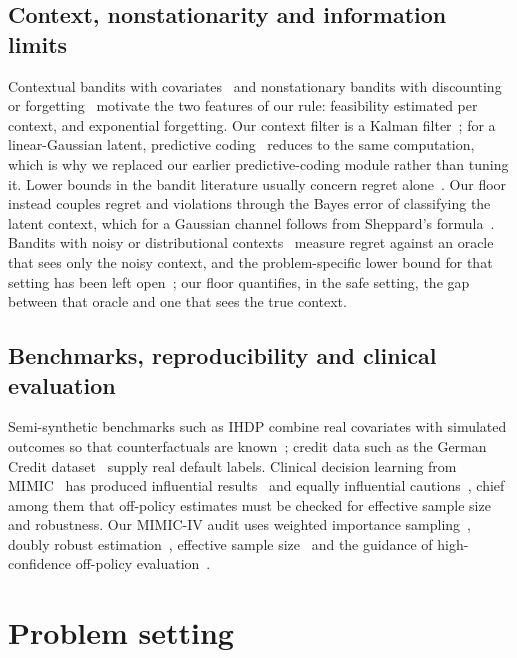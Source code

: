\documentclass[10pt,a4paper]{article}
\begin{document}
\subsection*{Context, nonstationarity and information limits}
Contextual bandits with covariates~\cite{rigollet2010} and nonstationary bandits with discounting or
forgetting~\cite{russac2019} motivate the two features of our rule: feasibility estimated per
context, and exponential forgetting. Our context filter is a Kalman filter~\cite{kalman1960}; for a
linear-Gaussian latent, predictive coding~\cite{rao1999} reduces to the same computation, which is why we replaced our earlier predictive-coding module rather than tuning it. Lower bounds in the
bandit literature usually concern regret alone~\cite{lattimore2020}. Our floor instead couples regret
and violations through the Bayes error of classifying the latent context, which for a Gaussian
channel follows from Sheppard's formula~\cite{sheppard1899}. Bandits with noisy or distributional contexts~\cite{kirschner2019,kim2023} measure regret against an oracle that sees only the noisy context, and the problem-specific lower bound for that setting has been left open~\cite{kim2023}; our floor quantifies, in the safe setting, the gap between that oracle and one that sees the true context.

\subsection*{Benchmarks, reproducibility and clinical evaluation}
Semi-synthetic benchmarks such as IHDP combine real covariates with simulated outcomes so that
counterfactuals are known~\cite{hill2011,shalit2017,dorie2019}; credit data such as the German Credit
dataset~\cite{hofmann1994} supply real default labels.  Clinical decision learning from MIMIC~\cite{johnson2023mimic,goldberger2000} has produced
influential results~\cite{komorowski2018} and equally influential cautions~\cite{gottesman2019}, chief
among them that off-policy estimates must be checked for effective sample size and robustness.
Our MIMIC-IV audit uses weighted importance sampling~\cite{precup2000}, doubly robust
estimation~\cite{dudik2011,jiang2016}, effective sample size~\cite{kong1992} and the guidance of
high-confidence off-policy evaluation~\cite{thomas2015hcope,thomas2016}. 

\section*{Problem setting}
\end{document}

